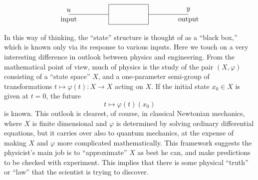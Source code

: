 \documentclass[12pt]{book}
\theoremstyle{plain}
\theoremstyle{definition}
\begin{document}
\begin{enumerate}
    \begin{equation*}
    \begin{tikzpicture}
        \node[draw, rectangle, minimum width=2cm, minimum height=1cm] (box) at (0,0) {};
        \draw (box.west) -- ++(-2,0) node[above]{$u$} node[below]{input};
        \draw (box.east) -- ++(2,0) node[above]{$y$} node[below]{output};
    \end{tikzpicture}
    \end{equation*}
    
    In this way of thinking, the ``state'' structure is thought of as a ``black box,'' which is known only via its response to various inputs.
    Here we touch on a very interesting difference in outlook between physics and engineering.
    From the mathematical point of view, much of physics is the study of the pair $(X, \varphi)$ consisting of a ``state space'' $X$, and a one-parameter semi-group of transformations $t \mapsto \varphi(t): X \to X$ acting on $X$.
    If the initial state $x_0 \in X$ is given at $t = 0$, the future
    $$t \mapsto \varphi(t)(x_0)$$
    is known.
    This outlook is clearest, of course, in classical Newtonian mechanics, where $X$ is finite dimensional and $\varphi$ is determined by solving ordinary differential equations, but it carries over also to quantum mechanics, at the expense of making $X$ and $\varphi$ more complicated mathematically.
    This framework suggests the physicist's main job is to ``approximate'' $X$ as best he can, and make predictions to be checked with experiment.
    This implies that there is some physical ``truth'' or ``law'' that the scientist is trying to discover.
\end{enumerate}
\end{document}
